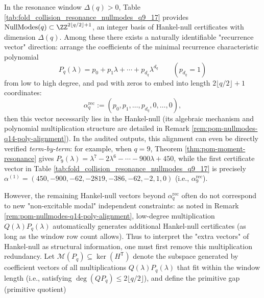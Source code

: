 



\begin{remark}\label{rem:pom-nullmodes-recurrence-plus-signature}
In the resonance window \(\Delta(q)>0\), Table \ref{tab:fold_collision_resonance_nullmodes_q9_17} provides
\(
\mathrm{NullModes}(q)\subset\ZZ^{2\lfloor q/2\rfloor+1}
\),
an integer basis of Hankel-null certificates with dimension \(\Delta(q)\).
Among these there exists a naturally identifiable "recurrence vector" direction: arrange the coefficients of the minimal recurrence characteristic polynomial
\[
P_q(\lambda)=p_0+p_1\lambda+\cdots+p_{d_q}\lambda^{d_q}\qquad(p_{d_q}=1)
\]
from low to high degree, and pad with zeros to embed into length \(2\lfloor q/2\rfloor+1\) coordinates:
\[
\alpha^{\mathrm{rec}}_q:=(p_0,p_1,\ldots,p_{d_q},0,\ldots,0),
\]
then this vector necessarily lies in the Hankel-null (its algebraic mechanism and polynomial multiplication structure are detailed in Remark \ref{rem:pom-nullmodes-q14-poly-alignment}).
In the audited outputs, this alignment can even be directly verified \emph{term-by-term}: for example, when \(q=9\), Theorem \ref{thm:pom-moment-resonance} gives
\(
P_9(\lambda)=\lambda^7-2\lambda^6-\cdots-900\lambda+450
\),
while the first certificate vector in Table \ref{tab:fold_collision_resonance_nullmodes_q9_17} is precisely
\(
\alpha^{(1)}=(450,-900,-62,-2819,-386,-62,-2,1,0)
\)
(i.e., \(\alpha^{\mathrm{rec}}_9\)).
\par
However, the remaining Hankel-null vectors beyond \(\alpha^{\mathrm{rec}}_q\) often do not correspond to new "non-excitable modal" independent constraints: as noted in Remark \ref{rem:pom-nullmodes-q14-poly-alignment}, low-degree multiplication \(Q(\lambda)P_q(\lambda)\) automatically generates additional Hankel-null certificates (as long as the window row count allows).
Thus to interpret the "extra vectors" of Hankel-null as structural information, one must first remove this multiplication redundancy.
Let \(\mathcal{M}(P_q)\subseteq\ker(H^{\mathsf T})\) denote the subspace generated by coefficient vectors of all multiplications \(Q(\lambda)P_q(\lambda)\) that fit within the window length (i.e., satisfying \(\deg(QP_q)\le 2\lfloor q/2\rfloor\)), and define the primitive gap (primitive quotient)

\end{remark}
